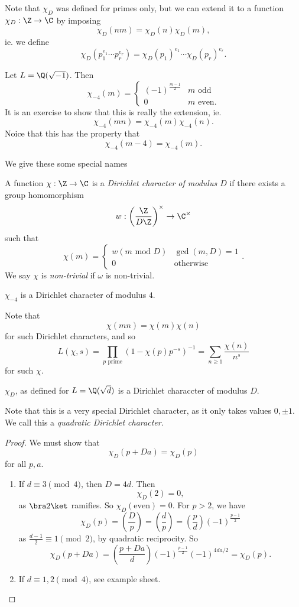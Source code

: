 \documentclass[a4paper]{article}
\begin{document}
Note that $\chi_D$ was defined for primes only, but we can extend it to a function $\chi_D: \Z \to \C$ by imposing
\[
  \chi_D(nm) = \chi_D(n)\chi_D(m),
\]
ie. we define
\[
  \chi_D(p_1^{e_1} \cdots p_r^{e_r}) = \chi_D(p_1)^{e_1} \cdots \chi_D(p_r)^{e_r}.
\]
\begin{eg}
  Let $L = \Q(\sqrt{-1})$. Then
  \[
    \chi_{-4}(m) =
    \begin{cases}
      (-1)^{\frac{m - 1}{2}} & m\text{ odd}\\
      0 & m\text{ even}.
    \end{cases}
  \]
  It is an exercise to show that this is really the extension, ie.
  \[
    \chi_{-4}(mn) = \chi_{-4}(m) \chi_{-4}(n).
  \]
  Noice that this has the property that
  \[
    \chi_{-4}(m - 4) = \chi_{-4}(m).
  \]
\end{eg}
We give these some special names
\begin{defi}
  A function $\chi: \Z \to \C$ is a \emph{Dirichlet character of modulus $D$} if there exists a group homomorphism
  \[
    w: \left(\frac{\Z}{D\Z}\right)^\times \to \C^\times
  \]
  such that
  \[
    \chi(m) =
    \begin{cases}
      w(m\text{ mod } D) & \gcd(m, D) = 1\\
      0 & \text{otherwise}
    \end{cases}.
  \]
  We say $\chi$ is \emph{non-trivial} if $\omega$ is non-trivial.
\end{defi}

\begin{eg}
  $\chi_{-4}$ is a Dirichlet character of modulus $4$.
\end{eg}

Note that
\[
  \chi(mn) = \chi(m)\chi(n)
\]
for such Dirichlet characters, and so
\[
  L(\chi, s) = \prod_{p\text{ prime}} (1 - \chi(p)p^{-s})^{-1} = \sum_{n \geq 1} \frac{\chi(n)}{n^s}
\]
for such $\chi$.

\begin{prop}
  $\chi_D$, as defined for $L = \Q(\sqrt{d})$ is a Dirichlet characcter of modulus $D$.
\end{prop}
Note that this is a very special Dirichlet character, as it only takes values $0, \pm 1$. We call this a \emph{quadratic Dirichlet character}.

\begin{proof}
  We must show that
  \[
    \chi_D(p + Da) = \chi_D(p)
  \]
  for all $p, a$.
  \begin{enumerate}
    \item If $d \equiv 3 \pmod 4$, then $D = 4d$. Then
      \[
        \chi_D(2) = 0,
      \]
      as $\bra 2\ket$ ramifies. So $\chi_D(\text{even}) = 0$. For $p > 2$, we have
      \[
        \chi_D(p) = \left(\frac{D}{p}\right) = \left(\frac{d}{p}\right) = \left(\frac{p}{d}\right) (-1)^{\frac{p - 1}{2}}
      \]
      as $\frac{d - 1}{2} \equiv 1 \pmod 2$, by quadratic reciprocity. So
      \[
        \chi_D(p + Da) = \left(\frac{p + Da}{d}\right) (-1)^{\frac{p - 1}{2}} (-1)^{4da/2} = \chi_D(p).
      \]
    \item If $d \equiv 1, 2\pmod 4$, see example sheet.
  \end{enumerate}
\end{proof}
\end{document}
